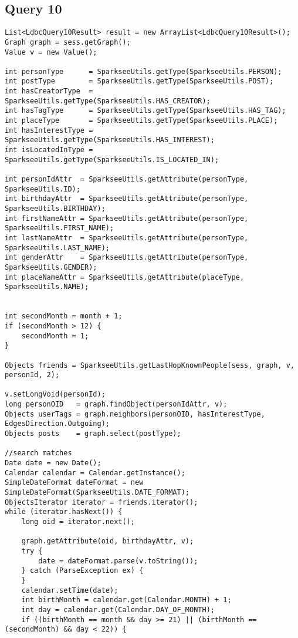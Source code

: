 \subsection{Query 10}

{\footnotesize
\begin{verbatim}
List<LdbcQuery10Result> result = new ArrayList<LdbcQuery10Result>();
Graph graph = sess.getGraph();
Value v = new Value();

int personType      = SparkseeUtils.getType(SparkseeUtils.PERSON);
int postType        = SparkseeUtils.getType(SparkseeUtils.POST);
int hasCreatorType  = SparkseeUtils.getType(SparkseeUtils.HAS_CREATOR);
int hasTagType      = SparkseeUtils.getType(SparkseeUtils.HAS_TAG);
int placeType       = SparkseeUtils.getType(SparkseeUtils.PLACE);
int hasInterestType = SparkseeUtils.getType(SparkseeUtils.HAS_INTEREST);
int isLocatedInType = SparkseeUtils.getType(SparkseeUtils.IS_LOCATED_IN);

int personIdAttr  = SparkseeUtils.getAttribute(personType, SparkseeUtils.ID);
int birthdayAttr  = SparkseeUtils.getAttribute(personType, SparkseeUtils.BIRTHDAY);
int firstNameAttr = SparkseeUtils.getAttribute(personType, SparkseeUtils.FIRST_NAME);
int lastNameAttr  = SparkseeUtils.getAttribute(personType, SparkseeUtils.LAST_NAME);
int genderAttr    = SparkseeUtils.getAttribute(personType, SparkseeUtils.GENDER);
int placeNameAttr = SparkseeUtils.getAttribute(placeType,  SparkseeUtils.NAME);


int secondMonth = month + 1;
if (secondMonth > 12) {
    secondMonth = 1;
}

Objects friends = SparkseeUtils.getLastHopKnownPeople(sess, graph, v, personId, 2);

v.setLongVoid(personId);
long personOID   = graph.findObject(personIdAttr, v);
Objects userTags = graph.neighbors(personOID, hasInterestType, EdgesDirection.Outgoing);
Objects posts    = graph.select(postType);

//search matches
Date date = new Date();
Calendar calendar = Calendar.getInstance();
SimpleDateFormat dateFormat = new SimpleDateFormat(SparkseeUtils.DATE_FORMAT);
ObjectsIterator iterator = friends.iterator();
while (iterator.hasNext()) {
    long oid = iterator.next();

    graph.getAttribute(oid, birthdayAttr, v);
    try {
        date = dateFormat.parse(v.toString());
    } catch (ParseException ex) {
    }
    calendar.setTime(date);
    int birthMonth = calendar.get(Calendar.MONTH) + 1;
    int day = calendar.get(Calendar.DAY_OF_MONTH);
    if ((birthMonth == month && day >= 21) || (birthMonth == (secondMonth) && day < 22)) {


\end{verbatim}}
